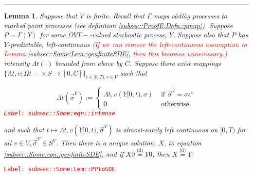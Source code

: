 \documentclass[12pt]{article}
\newcommand{\ra}{\rightarrow}
\newcommand{\te}{\text}
\newcommand{\ep}{\epsilon}
\newcommand{\tr}{\textcolor{red}}
\newcommand{\labe}[1]{\tr{\texttt{Label: #1}}}
\newcommand{\lin}{\rule{\linewidth}{0.4 pt}}
\newcommand{\deq}{\overset{\text{(d)}}{=}}			%
\renewcommand{\v}{v}							%
\renewcommand{\S}{S}							%
\newcommand{\s}{\sigma}							%
\newcommand{\sv}{\vec{\s}}						%
\newcommand{\ev}{\ep}							%
\newcommand{\T}{T}								%
\renewcommand{\t}{t}							%
\newcommand{\X}{X}								%
\newcommand{\vind}[1]{^{#1}}					%
\newcommand{\carp}[1]{^{#1}}					%
\newcommand{\vsi}[1]{^{#1}}						%
\newcommand{\cind}[1]{_{#1}}					%
\newcommand{\const}{C}							%
\newcommand{\XX}{Y}								%
\newcommand{\pmap}{\Gamma}						%
\newcommand{\rp}{P}								%
\newcommand{\ratee}{\Lambda}					%
\newtheorem{lem}[thms]{Lemma}
\begin{document}
\lin

\begin{lem}
Suppose that \(V\) is finite. Recall that \(\pmap{}\) maps c\`adl\`ag processes to marked point processes (see definition \ref{subsec::ProofE:Defn::pmap}). Suppose \(\rp{} = \pmap{}(\XX{}{})\) for some \(\Omega{V}{\T-}\)-valued stochastic process, \(\XX{}{}\). Suppose also that \(\rp{}\) has \(\XX{}{}\)-predictable, left-continuous \tr{(If we can remove the left-continuous assumption in Lemma \ref{subsec::Some:Lem::genfiniteSDE}, then this becomes unnecessary.)} intensity \(\ratee{\t}(\cdot)\) bounded from above by \(\const{}\). Suppose there exist mappings \(\{\ratee{\t,\v}:\Omega{}{\t-}\times \S \ra [0,\const{}]\}_{\t\in[0,\T),\v\in V}\) such that 

\begin{equation}
\ratee{\t}(\sv\cind{}\vsi{V}) := \begin{cases}
\ratee{\t,\v}(\XX{}{[0,\t)},\s) &\te{ if } \sv\cind{}\vsi{V} = \s\ev\vind{\v}\\
0 &\te{ otherwise,}
\end{cases}
\label{subsec::Some:eqn::intense}
\end{equation}
\labe{subsec::Some:eqn::intense}

and such that \(\t\mapsto \ratee{\t,\v}(\XX{}{[0,\t)},\sv\cind{}\vsi{V})\) is almost-surely left continuous on \([0,\T)\) for all \(\v\in V,\sv\cind{}\vsi{V}\in \S\carp{V}\). Then there is a unique solution, \(\X{}{}\), to equation \eqref{subsec::Some:eqn::genfiniteSDE}, and if \(\X{}{0} \deq \XX{}{0}\), then \(\X{}{} \deq \XX{}{}\).

\label{subsec::Some:Lem::PPtoSDE}
\end{lem}
\labe{subsec::Some:Lem::PPtoSDE}
\end{document}
